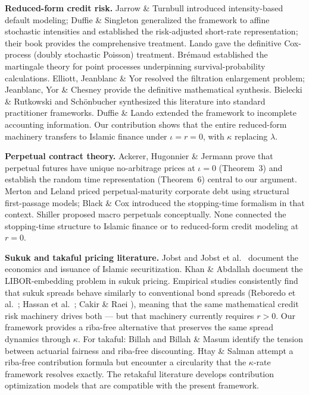 \documentclass[10pt,twocolumn]{article}
\theoremstyle{plain}
\theoremstyle{definition}
\begin{document}
\textbf{Reduced-form credit risk.}
Jarrow \& Turnbull \cite{JarrowTurnbull1995} introduced intensity-based default
modeling; Duffie \& Singleton \cite{DuffieSingleton1999} generalized the
framework to affine stochastic intensities and established the risk-adjusted
short-rate representation; their book \cite{DuffieSingleton2003} provides the
comprehensive treatment. Lando \cite{Lando1998} gave the definitive Cox-process
(doubly stochastic Poisson) treatment. Brémaud \cite{Bremaud1981} established
the martingale theory for point processes underpinning survival-probability
calculations. Elliott, Jeanblanc \& Yor \cite{ElliottJeanblanc2000} resolved
the filtration enlargement problem; Jeanblanc, Yor \& Chesney
\cite{JeanblanYorChesney2009} provide the definitive mathematical synthesis.
Bielecki \& Rutkowski \cite{BieleckiRutkowski2002} and Schönbucher
\cite{Schonbucher2003} synthesized this literature into standard practitioner
frameworks. Duffie \& Lando \cite{DuffieLando2001} extended the framework to
incomplete accounting information. Our contribution shows that the entire
reduced-form machinery transfers to Islamic finance under $\iota = r = 0$,
with $\kappa$ replacing $\lambda$.

\textbf{Perpetual contract theory.}
Ackerer, Hugonnier \& Jermann \cite{Ackerer2024} prove that perpetual futures
have unique no-arbitrage prices at $\iota = 0$ (Theorem~3) and establish the
random time representation (Theorem~6) central to our argument.
Merton \cite{Merton1974} and Leland \cite{Leland1994} priced perpetual-maturity
corporate debt using structural first-passage models; Black \& Cox \cite{BlackCox1976}
introduced the stopping-time formalism in that context.
Shiller \cite{Shiller1993} proposed macro perpetuals conceptually.
None connected the stopping-time structure to Islamic finance or to
reduced-form credit modeling at $r = 0$.

\textbf{Sukuk and takaful pricing literature.}
Jobst \cite{Jobst2007} and Jobst et al.\ \cite{JobstHull2008} document
the economics and issuance of Islamic securitization.
Khan \& Abdallah \cite{KhanAbdallah2017} document the LIBOR-embedding
problem in sukuk pricing. Empirical studies consistently find that sukuk
spreads behave similarly to conventional bond spreads (Reboredo et al.\
\cite{Reboredo2021}; Hassan et al.\ \cite{Hassan2021}; Cakir \& Raei
\cite{CakirRaei2007}), meaning that the same mathematical credit risk
machinery drives both --- but that machinery currently requires $r > 0$.
Our framework provides a riba-free alternative that preserves the same
spread dynamics through $\kappa$.
For takaful: Billah \cite{Billah2007} and Billah \& Masum \cite{BillahMasum2023}
identify the tension between actuarial fairness and riba-free discounting.
Htay \& Salman \cite{HtaySalman2012} attempt a riba-free contribution formula
but encounter a circularity that the $\kappa$-rate framework resolves exactly.
The retakaful literature \cite{ActuarialRetakaful2022} develops contribution
optimization models that are compatible with the present framework.
\end{document}
